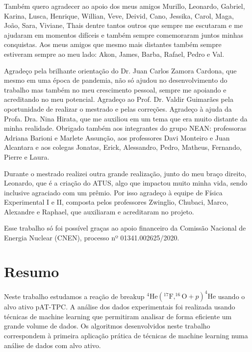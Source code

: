 \documentclass[a4paper,12pt,oneside]{book}
\begin{document}
\par Também quero agradecer ao apoio dos meus amigos Murillo, Leonardo, Gabriel, Karina, Lusca, Henrique, Willian, Veve, Deivid, Cano, Jessika, Carol, Maga, João, Sara, Viviane, Thais dentre tantos outros que sempre me escutaram e me ajudaram em momentos difíceis e também sempre comemoraram juntos minhas conquistas. Aos meus amigos que mesmo mais distantes também sempre estiveram sempre ao meu lado: Akon, James, Barba, Rafael, Pedro e Val.

\par Agradeço pela brilhante orientação do Dr. Juan Carlos Zamora Cardona, que mesmo em uma época de pandemia, não só ajudou no desenvolvimento do trabalho mas também no meu crescimento pessoal, sempre me apoiando e acreditando no meu potencial. Agradeço ao Prof. Dr. Valdir Guimarães pela oportunidade de realizar o mestrado e pelas correções. Agradeço à ajuda da Profa. Dra. Nina Hirata, que me auxiliou em um tema que era muito distante da minha realidade. Obrigado também aos integrantes do grupo NEAN: professoras Adriana Barioni e Marlete Assunção, aos professores Davi Monteiro e Juan Alcantara e aos colegas Jonatas, Erick, Alessandro, Pedro, Matheus, Fernando, Pierre e Laura.

\par Durante o mestrado realizei outra grande realização, junto do meu braço direito, Leonardo, que é a criação do ATUS, algo que impactou muito minha vida, sendo inclusive agraciado com um prêmio. Por isso agradeço à equipe de Física Experimental I e II, composta pelos professores Zwinglio, Chubaci, Marco, Alexandre e Raphael, que auxiliaram e acreditaram no projeto.

\par Esse trabalho só foi possível graças ao apoio financeiro da Comissão Nacional de Energia Nuclear (CNEN), processo nº 01341.002625/2020.



\chapter*{Resumo}
\thispagestyle{empty}
\par Neste trabalho estudamos a reação de breakup $^4\mathrm{He}(^{17}\mathrm{F},^{16}\mathrm{O}+p)^4\mathrm{He}$ usando o alvo ativo pAT-TPC. A análise dos dados experimentais foi realizada usando técnicas de machine learning que permitiram analisar de forma eficiente um grande volume de dados. Os algoritmos desenvolvidos neste trabalho correspondem à primeira aplicação prática de técnicas de machine learning numa análise de dados com alvo ativo.
\end{document}
